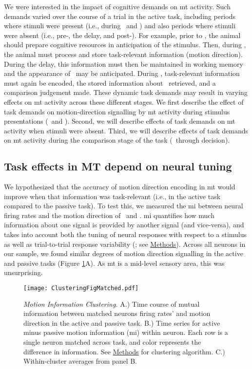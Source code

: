 We were interested in the impact of cognitive demands on \gls{mt} activity. Such demands varied over the course of a trial in the active task, including periods where stimuli were present (i.e., during \sample\ and \test) and also periods where stimuli were absent (i.e., pre-\sample, the delay, and post-\test). For example, prior to \sample, the animal should prepare cognitive resources in anticipation of the stimulus. Then, during \sample, the animal must process and store task-relevant information (motion direction). During the delay, this information must then be maintained in working memory and the appearance of \test\ may be anticipated. During \test, task-relevant information must again be encoded, the stored information about \sample\ retrieved, and a comparison judgement made. These dynamic task demands may result in varying effects on \gls{mt} activity across these different stages. We first describe the effect of task demands on motion-direction signalling by \gls{mt} activity during stimulus presentations (\sample\ and \test).
Second, we will describe effects of task demands on \gls{mt} activity when stimuli were absent. Third, we will describe effects of task demands on \gls{mt} activity during the comparison stage of the task (\test\ through decision).

\subsection*{Task effects in MT depend on neural tuning}
We hypothesized that the accuracy of motion direction encoding in \gls{mt} would improve when that information was task-relevant (i.e., in the active task compared to the passive task).
To test this, we measured the \gls{mi} between neural firing rates and the motion direction of \sample\ and \test. \Gls{mi} quantifies how much information about one signal is provided by another signal (and vice-versa), and takes into account both the tuning of neural responses with respect to a stimulus as well as trial-to-trial response variability (\cite{Hatsopoulos1998, QuianQuiroga2009}; see \hyperref[{sec:methods}]{Methods}).
Across all neurons in our sample, we found similar degrees of motion direction signalling in the active and passive tasks (Figure \ref{fig:MI}A). As \gls{mt} is a mid-level sensory area, this was unsurprising. 

\begin{figure}
	\centering
	\texttt{[image: ClusteringFigMatched.pdf]}
	\caption[Unsupervised Clustering of neurons by Task-Effect]
	{{\it Motion Information Clustering.} A.) Time course of mutual information between matched neurons firing rates' and motion direction in the active and passive task. B.) Time series for active minus passive motion information (\gls{mi}) within neuron. Each row is a single neuron matched across task, and color represents the difference in information. See \hyperref[{sec:methods}]{Methods} for clustering algorithm. C.) Within-cluster averages from panel B.}
	\captionsetup{singlelinecheck = false, font=footnotesize, labelsep=space}
	\label{fig:MI}
\end{figure}

